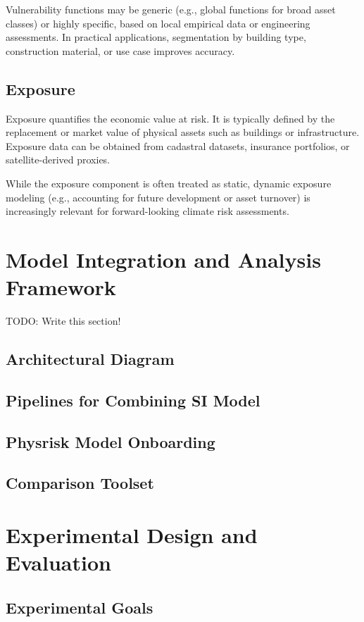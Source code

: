 \documentclass[a4paper,10.80pt,twoside]{article}
\begin{document}
Vulnerability functions may be generic (e.g., global functions for broad asset classes) or highly specific, based on local empirical data or engineering assessments. In practical applications, segmentation by building type, construction material, or use case improves accuracy.

\subsection{Exposure}

Exposure quantifies the economic value at risk. It is typically defined by the replacement or market value of physical assets such as buildings or infrastructure. Exposure data can be obtained from cadastral datasets, insurance portfolios, or satellite-derived proxies.

While the exposure component is often treated as static, dynamic exposure modeling (e.g., accounting for future development or asset turnover) is increasingly relevant for forward-looking climate risk assessments.



\section{Model Integration and Analysis Framework}
TODO: Write this section!

\subsection{Architectural Diagram}
\subsection{Pipelines for Combining SI Model}
\subsection{Physrisk Model Onboarding}
\subsection{Comparison Toolset}

\section{Experimental Design and Evaluation}
\subsection{Experimental Goals}
\end{document}
